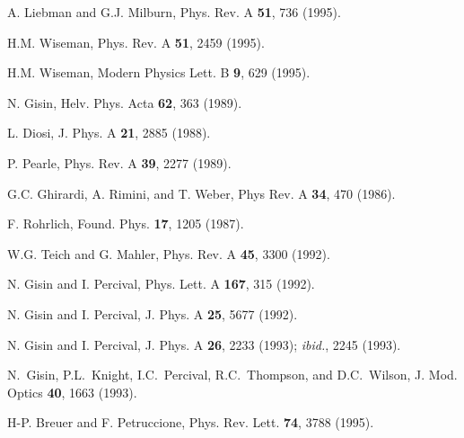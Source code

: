 \documentclass[12pt]{article}
\begin{document}
\begin{thebibliography}{99}
A. Liebman and G.J. Milburn,
Phys. Rev. A {\bf 51}, 736 (1995).

H.M. Wiseman,
Phys. Rev. A {\bf 51}, 2459 (1995).

H.M. Wiseman,
Modern Physics Lett. B {\bf 9}, 629 (1995).

N. Gisin, %
Helv. Phys. Acta {\bf 62}, 363 (1989).

L. Diosi, 
J. Phys. A {\bf 21}, 2885 (1988).

P. Pearle,
Phys. Rev. A {\bf 39}, 2277 (1989).

G.C. Ghirardi, A. Rimini, and T. Weber, 
Phys Rev. A {\bf 34}, 470 (1986).

F. Rohrlich,
Found. Phys. {\bf 17}, 1205 (1987).

W.G. Teich and G. Mahler,
Phys. Rev. A {\bf 45}, 3300 (1992).

N. Gisin and I. Percival,
Phys. Lett. A {\bf 167}, 315 (1992).

N. Gisin and I. Percival,
J. Phys. A {\bf 25}, 5677 (1992).

N. Gisin and I. Percival,
J. Phys. A {\bf 26}, 2233 (1993); 
{\em ibid.}, 2245 (1993).

N.~Gisin, P.L.~Knight, I.C.~Percival, R.C.~Thompson, and 
D.C.~Wilson,
J. Mod. Optics {\bf 40}, 1663 (1993).

H-P. Breuer and F. Petruccione,
Phys. Rev. Lett. {\bf 74}, 3788 (1995).


\end{thebibliography}
\end{document}
